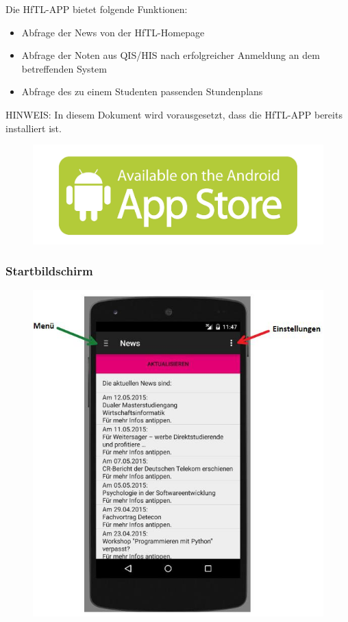 Die HfTL-APP bietet folgende Funktionen:

\begin{itemize}
\item Abfrage der News von der HfTL-Homepage
\item Abfrage der Noten aus QIS/HIS nach erfolgreicher Anmeldung an dem betreffenden System
\item Abfrage des zu einem Studenten passenden Stundenplans
\end{itemize}

HINWEIS: In diesem Dokument wird vorausgesetzt, dass die HfTL-APP bereits installiert ist.
\begin{figure}[h]
	\centering
	\includegraphics[scale=0.5]{03_Bedienungsanleitung/img/appstore.jpg}
	\label{img:grafik-dummy}
\end{figure}

\newpage

\subsubsection{Startbildschirm}


\begin{figure}[h]
	\centering
	\includegraphics[scale=0.8]{03_Bedienungsanleitung/img/start2.jpg}
	\label{img:grafik-dummy}
\end{figure}

